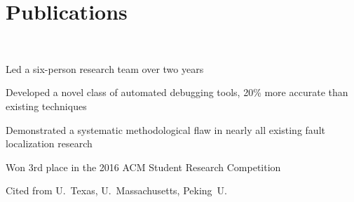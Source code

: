 \section{Publications}

 \\
\vspace{\topsep} %
\begin{tightemize}
\item Led a six-person research team over two years
\item Developed a novel class of automated debugging tools, 20\% more accurate than existing techniques
\item Demonstrated a systematic methodological flaw in nearly all existing fault localization research
\item Won 3rd place in the 2016 ACM Student Research Competition
\item Cited from U.~Texas, U.~Massachusetts, Peking~U.
\end{tightemize}
\sectionsep
